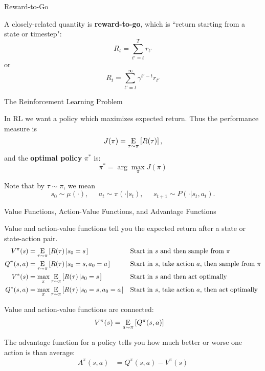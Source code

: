 \begin{frame}{Reward-to-Go}

A closely-related quantity is \textbf{reward-to-go}, which is ``return starting from a state or timestep":
%
\begin{equation*}
R_t = \sum_{t'=t}^T r_{t'}
\end{equation*}
%
or
\begin{equation*}
R_t = \sum_{t'=t}^{\infty} \gamma^{t'-t} r_{t'}
\end{equation*}
\end{frame}

\begin{frame}{The Reinforcement Learning Problem}

In RL we want a policy which maximizes expected return. Thus the performance measure is
%
\begin{equation*}
J(\pi) = \underset{\begin{subarray}{c}\tau \sim \pi \end{subarray}}{{\mathrm E}}\left[ R(\tau) \right],
\end{equation*}
%
and the \textbf{optimal policy} $\pi^*$ is:
%
\begin{equation*}
\pi^* = \arg \max_{\pi} J(\pi)
\end{equation*}

Note that by $\tau \sim \pi$, we mean
%
\begin{equation*}
s_0 \sim \mu(\cdot), \;\;\;\;\; a_t \sim \pi(\cdot|s_t), \;\;\;\;\; s_{t+1} \sim P(\cdot | s_t, a_t).
\end{equation*}

\end{frame}


\begin{frame}{Value Functions, Action-Value Functions, and Advantage Functions}

Value and action-value functions tell you the expected return after a state or state-action pair.
%
\begin{align*}
V^{\pi}(s) &= \underset{\begin{subarray}{c}\tau \sim \pi \end{subarray}}{{\mathrm E}}\left[ R(\tau)\left| s_0 = s\right. \right] && \text{Start in }s\text{ and then sample from }\pi \\
Q^{\pi}(s,a) &= \underset{\begin{subarray}{c}\tau \sim \pi \end{subarray}}{{\mathrm E}}\left[ R(\tau)\left| s_0 = s, a_0 = a\right. \right] && \text{Start in }s\text{, take action }a\text{, then sample from }\pi \\
V^*(s) &= \max_{\pi} \underset{\begin{subarray}{c}\tau \sim \pi \end{subarray}}{{\mathrm E}}\left[ R(\tau)\left| s_0 = s\right. \right] && \text{Start in }s\text{ and then act optimally} \\
Q^*(s,a) &= \max_{\pi} \underset{\begin{subarray}{c}\tau \sim \pi \end{subarray}}{{\mathrm E}}\left[ R(\tau)\left| s_0 = s, a_0 = a\right. \right] &&\text{Start in }s\text{, take action }a\text{, then act optimally}
\end{align*}

Value and action-value functions are connected:
%
\begin{align*}
V^{\pi}(s) &= \underset{\begin{subarray}{c}a \sim \pi \end{subarray}}{{\mathrm E}}\left[ Q^{\pi}(s,a) \right]
\end{align*}

The advantage function for a policy tells you how much better or worse one action is than average:
%
\begin{align*}
A^{\pi}(s,a) &= Q^{\pi}(s,a) - V^{\pi}(s) 
\end{align*}

\end{frame}

